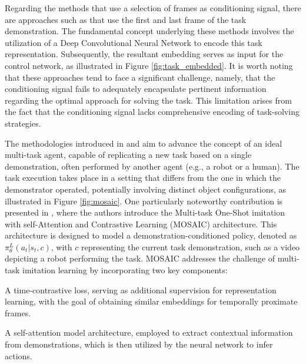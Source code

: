 \newline Regarding the methods that use a selection of frames as conditioning signal, there are approaches such as \cite{james2018task_embedded,bhutani2022attentive_one_shot} that use the first and last frame of the task demonstration. The fundamental concept underlying these methods involves the utilization of a Deep Convolutional Neural Network to encode this task representation. Subsequently, the resultant embedding serves as input for the control network, as illustrated in Figure \ref{fig:task_embedded}. It is worth noting that these approaches tend to face a significant challenge, namely, that the conditioning signal fails to adequately encapsulate pertinent information regarding the optimal approach for solving the task. This limitation arises from the fact that the conditioning signal lacks comprehensive encoding of task-solving strategies.

\newline The methodologies introduced in \cite{bhutani2022attentive_one_shot} and \cite{mandi2022towards_more_generalizable_one_shot} aim to advance the concept of an ideal multi-task agent, capable of replicating a new task based on a single demonstration, often performed by another agent (e.g., a robot or a human). The task execution takes place in a setting that differs from the one in which the demonstrator operated, potentially involving distinct object configurations, as illustrated in Figure \ref{fig:mosaic}. One particularly noteworthy contribution is presented in \cite{mandi2022towards_more_generalizable_one_shot}, where the authors introduce the Multi-task One-Shot imitation with self-Attention and Contrastive Learning (MOSAIC) architecture. This architecture is designed to model a demonstration-conditioned policy, denoted as $\pi^{L}_{\theta}(a_{t}|s_{t},c)$, with $c$ representing the current task demonstration, such as a video depicting a robot performing the task. MOSAIC addresses the challenge of multi-task imitation learning by incorporating two key components:
\begin{enumerate*}[label=\textbf{(\arabic*)}]
    \item A time-contrastive loss, serving as additional supervision for representation learning, with the goal of obtaining similar embeddings for temporally proximate frames.
    \item A self-attention model architecture, employed to extract contextual information from demonstrations, which is then utilized by the neural network to infer actions.
\end{enumerate*}
